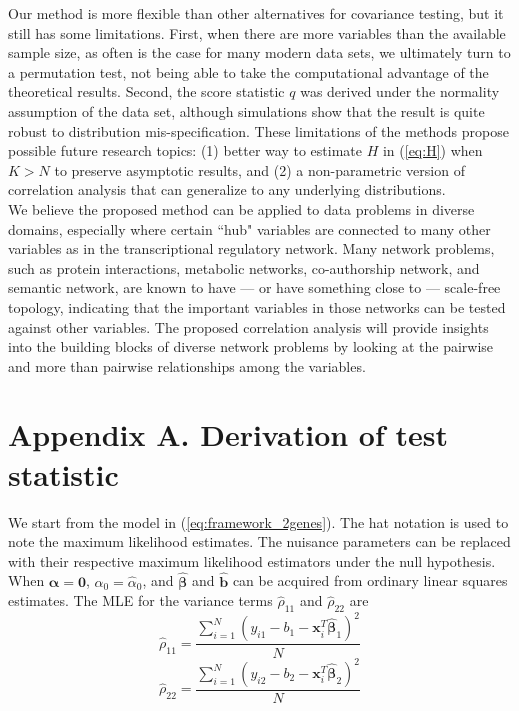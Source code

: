 \documentclass[aap,authoryear, preprint]{imsart}
\numberwithin{equation}{section}
\theoremstyle{plain}
\begin{document}
Our method is more flexible than other alternatives for covariance testing, but it still has some limitations. First, when there are more variables than the available sample size, as often is the case for many modern data sets, we ultimately turn to a permutation test, not being able to take the computational advantage of the theoretical results. Second, the score statistic $q$ was derived under the normality assumption of the data set, although simulations show that the result is quite robust to distribution mis-specification. These limitations of the methods propose possible future research topics: (1) better way to estimate $H$ in (\ref{eq:H}) when $K > N$ to preserve asymptotic results, and (2) a non-parametric version of correlation analysis that can generalize to any underlying distributions. \\

We believe the proposed method can be applied to data problems in diverse domains, especially where certain ``hub" variables are connected to many other variables as in the transcriptional regulatory network. Many network problems, such as protein interactions, metabolic networks, co-authorship network, and semantic network, are known to have --- or have something close to --- scale-free topology, indicating that the important variables in those networks can be tested against other variables. The proposed correlation analysis will provide insights into the building blocks of diverse network problems by looking at the pairwise and more than pairwise relationships among the variables.



 
\pagebreak
 
\section*{Appendix A. Derivation of test statistic}
We start from the model in (\ref{eq:framework_2genes}). The hat notation is used to note the maximum likelihood estimates. The nuisance parameters can be replaced with their respective maximum likelihood estimators under the null hypothesis. When $\bm{\alpha} = \bm{0}$, $\alpha_0 = \hat{\alpha}_0$, and $\hat{\bm{\beta}}$ and $\hat{\bm{b}}$ can be acquired from ordinary linear squares estimates. The MLE for the variance terms $\hat{\rho}_{11}$ and $\hat{\rho}_{22}$ are
$$\hat{\rho}_{11} =  \frac{\sum_{i=1}^{N}(y_{i1} - b_1 - \bm{x}_i^T\bm{\hat{\beta}}_{1})^2}{N}$$
$$\hat{\rho}_{22}=  \frac{\sum_{i=1}^{N}(y_{i2} - b_2 - \bm{x}_i^T\bm{\hat{\beta}}_{2})^2}{N}$$
\end{document}
